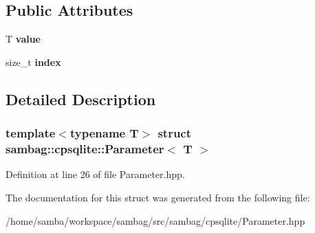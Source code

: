 \subsection*{Public Attributes}
\begin{DoxyCompactItemize}
\item 
\hypertarget{structsambag_1_1cpsqlite_1_1_parameter_a583a81c6aea0641db63392fe36e7e43a}{
T {\bfseries value}}
\label{structsambag_1_1cpsqlite_1_1_parameter_a583a81c6aea0641db63392fe36e7e43a}

\item 
\hypertarget{structsambag_1_1cpsqlite_1_1_parameter_a895e4e6e74b0fffad9b05fcf74e52107}{
size\_\-t {\bfseries index}}
\label{structsambag_1_1cpsqlite_1_1_parameter_a895e4e6e74b0fffad9b05fcf74e52107}

\end{DoxyCompactItemize}


\subsection{Detailed Description}
\subsubsection*{template$<$typename T$>$ struct sambag::cpsqlite::Parameter$<$ T $>$}



Definition at line 26 of file Parameter.hpp.



The documentation for this struct was generated from the following file:\begin{DoxyCompactItemize}
\item 
/home/samba/workspace/sambag/src/sambag/cpsqlite/Parameter.hpp\end{DoxyCompactItemize}
